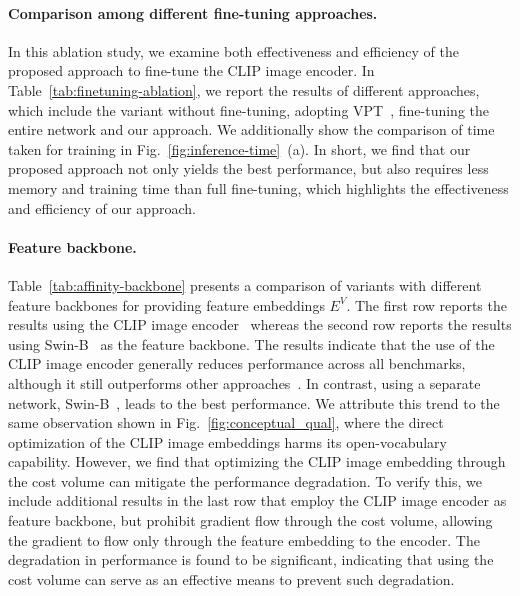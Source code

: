 \documentclass[10pt,twocolumn,letterpaper]{article}
\begin{document}
\vspace{-10pt}
\label{finetune}
\paragraph{Comparison among different fine-tuning approaches.}
In this ablation study, we examine both effectiveness and efficiency of the proposed approach to fine-tune the CLIP image encoder. In Table~\ref{tab:finetuning-ablation}, we report the results of different approaches, which include the variant without fine-tuning, adopting VPT~\cite{jia2022visual}, fine-tuning the entire network and our approach. We additionally show the comparison of time taken for training in Fig.~\ref{fig:inference-time}~(a). In short, we find that our proposed approach not only yields the best performance, but also requires less memory and training time than full fine-tuning, which highlights the effectiveness and efficiency of our approach.


\vspace{-10pt}
\paragraph{Feature backbone.}
Table~\ref{tab:affinity-backbone} presents a comparison of variants with different feature backbones for providing feature embeddings $E^V$. The first row reports the results using the CLIP image encoder~\cite{radford2021learning} whereas the second row reports the results using Swin-B~\cite{liu2021swin} as the feature backbone. The results indicate that the use of the CLIP image encoder generally reduces performance across all benchmarks, although it still outperforms other approaches~\cite{li2022language,xu2022simple, ding2022decoupling, liang2022open, ghiasi2022scaling}. In contrast, using a separate network, Swin-B~\cite{liu2021swin}, leads to the best performance. We attribute this trend to the same observation shown in Fig.~\ref{fig:conceptual_qual}, where the direct optimization of the CLIP image embeddings harms its open-vocabulary capability. However, we find that optimizing the CLIP image embedding through the cost volume can mitigate the performance degradation. To verify this, we include additional results in the last row that employ the CLIP image encoder as feature backbone, but prohibit gradient flow through the cost volume, allowing the gradient to flow only through the feature embedding to the encoder. The degradation in performance is found to be significant, indicating that using the cost volume can serve as an effective means to prevent such degradation.
\end{document}
